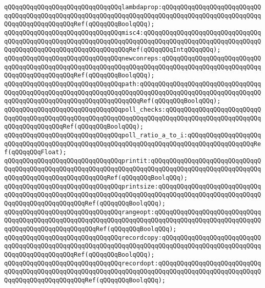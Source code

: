 \verb|qQQqqQQqqQQqqQQqqQQqqQQqqQQqqQQqlambdaprop:qQQqqQQqqQQqqQQqqQQqqQQqqQQqqQQqqQQqqQQqqQQqqQQqqQQqqQQqqQQqqQQqqQQqqQQqqQQqqQQqqQQqqQQqqQQqqQQqqQQqqQQqqQQqqQQqqQQqRef(qQQqqQQqBoolqQQq);|\newline
\newline
\verb|qQQqqQQqqQQqqQQqqQQqqQQqqQQqqQQqmisc4:qQQqqQQqqQQqqQQqqQQqqQQqqQQqqQQqqQQqqQQqqQQqqQQqqQQqqQQqqQQqqQQqqQQqqQQqqQQqqQQqqQQqqQQqqQQqqQQqqQQqqQQqqQQqqQQqqQQqqQQqqQQqqQQqqQQqqQQqRef(qQQqqQQqIntqQQqqQQq);|\newline
\newline
\verb|qQQqqQQqqQQqqQQqqQQqqQQqqQQqqQQqnewconreps:qQQqqQQqqQQqqQQqqQQqqQQqqQQqqQQqqQQqqQQqqQQqqQQqqQQqqQQqqQQqqQQqqQQqqQQqqQQqqQQqqQQqqQQqqQQqqQQqqQQqqQQqqQQqqQQqqQQqRef(qQQqqQQqBoolqQQq);|\newline
\verb|qQQqqQQqqQQqqQQqqQQqqQQqqQQqqQQqpath:qQQqqQQqqQQqqQQqqQQqqQQqqQQqqQQqqQQqqQQqqQQqqQQqqQQqqQQqqQQqqQQqqQQqqQQqqQQqqQQqqQQqqQQqqQQqqQQqqQQqqQQqqQQqqQQqqQQqqQQqqQQqqQQqqQQqqQQqqQQqRef(qQQqqQQqBoolqQQq);|\newline
\verb|qQQqqQQqqQQqqQQqqQQqqQQqqQQqqQQqpoll_checks:qQQqqQQqqQQqqQQqqQQqqQQqqQQqqQQqqQQqqQQqqQQqqQQqqQQqqQQqqQQqqQQqqQQqqQQqqQQqqQQqqQQqqQQqqQQqqQQqqQQqqQQqqQQqqQQqRef(qQQqqQQqBoolqQQq);|\newline
\newline
\verb|qQQqqQQqqQQqqQQqqQQqqQQqqQQqqQQqpoll_ratio_a_to_i:qQQqqQQqqQQqqQQqqQQqqQQqqQQqqQQqqQQqqQQqqQQqqQQqqQQqqQQqqQQqqQQqqQQqqQQqqQQqqQQqqQQqqQQqRef(qQQqqQQqFloat);|\newline
\newline
\verb|qQQqqQQqqQQqqQQqqQQqqQQqqQQqqQQqprintit:qQQqqQQqqQQqqQQqqQQqqQQqqQQqqQQqqQQqqQQqqQQqqQQqqQQqqQQqqQQqqQQqqQQqqQQqqQQqqQQqqQQqqQQqqQQqqQQqqQQqqQQqqQQqqQQqqQQqqQQqqQQqqQQqRef(qQQqqQQqBoolqQQq);|\newline
\verb|qQQqqQQqqQQqqQQqqQQqqQQqqQQqqQQqprintsize:qQQqqQQqqQQqqQQqqQQqqQQqqQQqqQQqqQQqqQQqqQQqqQQqqQQqqQQqqQQqqQQqqQQqqQQqqQQqqQQqqQQqqQQqqQQqqQQqqQQqqQQqqQQqqQQqqQQqqQQqRef(qQQqqQQqBoolqQQq);|\newline
\verb|qQQqqQQqqQQqqQQqqQQqqQQqqQQqqQQqrangeopt:qQQqqQQqqQQqqQQqqQQqqQQqqQQqqQQqqQQqqQQqqQQqqQQqqQQqqQQqqQQqqQQqqQQqqQQqqQQqqQQqqQQqqQQqqQQqqQQqqQQqqQQqqQQqqQQqqQQqqQQqqQQqRef(qQQqqQQqBoolqQQq);|\newline
\verb|qQQqqQQqqQQqqQQqqQQqqQQqqQQqqQQqrecordcopy:qQQqqQQqqQQqqQQqqQQqqQQqqQQqqQQqqQQqqQQqqQQqqQQqqQQqqQQqqQQqqQQqqQQqqQQqqQQqqQQqqQQqqQQqqQQqqQQqqQQqqQQqqQQqqQQqqQQqRef(qQQqqQQqBoolqQQq);|\newline
\verb|qQQqqQQqqQQqqQQqqQQqqQQqqQQqqQQqrecordopt:qQQqqQQqqQQqqQQqqQQqqQQqqQQqqQQqqQQqqQQqqQQqqQQqqQQqqQQqqQQqqQQqqQQqqQQqqQQqqQQqqQQqqQQqqQQqqQQqqQQqqQQqqQQqqQQqqQQqqQQqRef(qQQqqQQqBoolqQQq);|\newline

